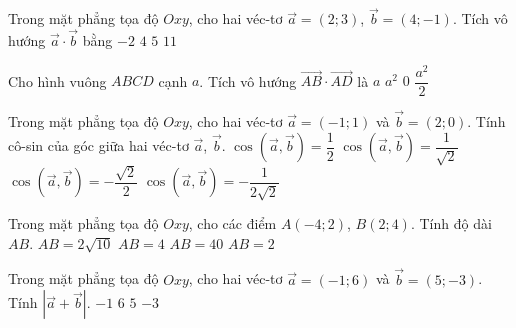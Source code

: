 \begin{ex}%
	Trong mặt phẳng tọa độ $Oxy$, cho hai véc-tơ $\overrightarrow{a} = (2;3)$, $\overrightarrow{b} = (4;-1)$. Tích vô hướng $\overrightarrow{a}\cdot\overrightarrow{b}$ bằng
	\choice
	{$-2$}
	{$4$}
	{\True $5$}
	{$11$}
\end{ex}

\begin{ex}%
	Cho hình vuông $ABCD$ cạnh $a$. Tích vô hướng $\overrightarrow{A B} \cdot \overrightarrow{A D}$ là
	\choice
	{$a$}
	{$a^{2}$}
	{\True $0$}
	{$\dfrac{a^{2}}{2}$}
\end{ex}

\begin{ex}%
	Trong mặt phẳng tọa độ $Oxy$, cho hai véc-tơ $\overrightarrow{a} =(-1;1)$ và $\overrightarrow{b} = (2;0)$. Tính cô-sin của góc giữa hai véc-tơ $\overrightarrow{a}$, $\overrightarrow{b}$.
	\choice
	{$\cos \left(\overrightarrow{a}, \overrightarrow{b}\right) =\dfrac{ 1}{2 }$}
	{$\cos \left(\overrightarrow{a}, \overrightarrow{b}\right) =\dfrac{1 }{ \sqrt{2}}$}
	{\True $\cos \left(\overrightarrow{a}, \overrightarrow{b}\right) =-\dfrac{\sqrt{2}}{2}$}
	{$\cos \left(\overrightarrow{a}, \overrightarrow{b}\right) =-\dfrac{1}{2\sqrt{2}}$}
\end{ex}

\begin{ex}%
	Trong mặt phẳng tọa độ $Oxy$, cho các điểm $A(-4;2)$, $B(2;4)$. Tính độ dài $AB$.
	\choice        
	{\True $AB=2\sqrt{10}$}
	{$AB=4$}
	{$AB=40$}
	{$AB=2$}
\end{ex}

\begin{ex}%
	Trong mặt phẳng tọa độ $Oxy$, cho hai véc-tơ $\overrightarrow{a}= (-1;6)$ và $\overrightarrow{b} = (5;-3)$. Tính $\left| \overrightarrow{a}+\overrightarrow{b} \right|$.
	\choice
	{$-1$}
	{$6$}
	{\True $5$}
	{$-3$}
\end{ex}

